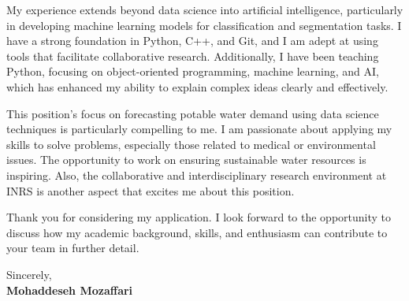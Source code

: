 \documentclass[letterpaper,11pt]{letter}
\begin{document}
My experience extends beyond data science into artificial intelligence, particularly in developing machine learning models for classification and segmentation tasks. I have a strong foundation in Python, C++, and Git, and I am adept at using tools that facilitate collaborative research. Additionally, I have been teaching Python, focusing on object-oriented programming, machine learning, and AI, which has enhanced my ability to explain complex ideas clearly and effectively.

This position's focus on forecasting potable water demand using data science techniques is particularly compelling to me. I am passionate about applying my skills to solve problems, especially those related to medical or environmental issues. The opportunity to work on ensuring sustainable water resources is inspiring. Also, the collaborative and interdisciplinary research environment at INRS is another aspect that excites me about this position. 

Thank you for considering my application. I look forward to the opportunity to discuss how my academic background, skills, and enthusiasm can contribute to your team in further detail.


\begin{flushleft}
    Sincerely, \\
    \textbf{Mohaddeseh Mozaffari}
\end{flushleft}
\end{document}
